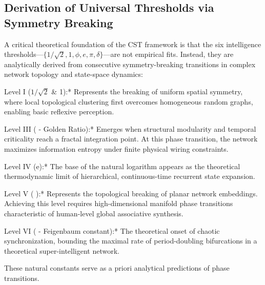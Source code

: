 \documentclass[a4paper,12pt]{article}
\begin{document}
\subsection{Derivation of Universal Thresholds via Symmetry Breaking}

A critical theoretical foundation of the CST framework is that the six intelligence thresholds---$\{1/\sqrt{2}, 1, \phi, e, \pi, \delta\}$---are not empirical fits. Instead, they are analytically derived from consecutive symmetry-breaking transitions in complex network topology and state-space dynamics:

Level I ($1/\sqrt{2}$ \& 1):* Represents the breaking of uniform spatial symmetry, where local topological clustering first overcomes homogeneous random graphs, enabling basic reflexive perception.

Level III ( \phi  - Golden Ratio):* Emerges when structural modularity and temporal criticality reach a fractal integration point. At this phase transition, the network maximizes information entropy under finite physical wiring constraints.

Level IV (e):* The base of the natural logarithm appears as the theoretical thermodynamic limit of hierarchical, continuous-time recurrent state expansion.

Level V ( \pi ):* Represents the topological breaking of planar network embeddings. Achieving this level requires high-dimensional manifold phase transitions characteristic of human-level global associative synthesis.

Level VI ( \delta  - Feigenbaum constant):* The theoretical onset of chaotic synchronization, bounding the maximal rate of period-doubling bifurcations in a theoretical super-intelligent network.

These natural constants serve as a priori analytical predictions of phase transitions.
\end{document}
